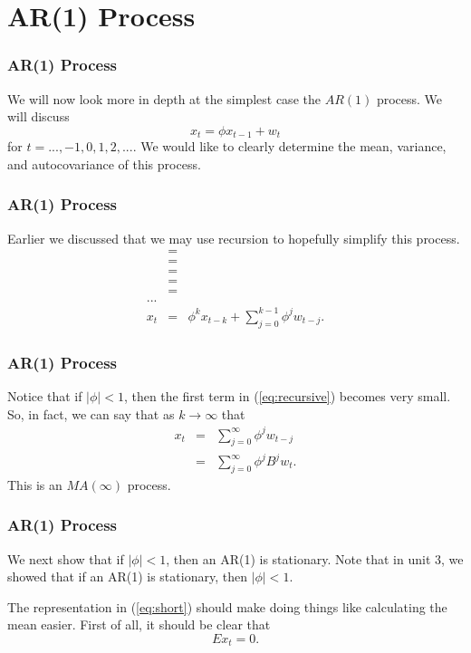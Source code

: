 \documentclass[%
xcolor=pdftex]{beamer}
\begin{document}
\section{AR(1) Process}
\frame{\tableofcontents[currentsection]}

\begin{frame}
\frametitle{AR(1) Process}

We will now look more in depth at the simplest case the $AR(1)$ process. We will discuss
$$
x_t= \phi x_{t-1}+w_t
$$
for $t=...,-1,0,1,2,...$.
We would like to clearly determine the mean, variance, and autocovariance of this process.

\end{frame}


\begin{frame}
\frametitle{AR(1) Process}

Earlier we discussed that we may use recursion to hopefully simplify this process.
\begin{eqnarray} \label{eq:recursive}
 & =&  \nonumber \\
 & =&  \nonumber \\
& =&  \nonumber \\
 &=&  \nonumber\\
&=&  \nonumber \\
...& & \nonumber \\
x_t & =&  \phi^k   x_{t-k}+\sum_{j=0}^{k-1} \phi^j w_{t-j}.
\end{eqnarray}

\end{frame}

\begin{frame}
\frametitle{AR(1) Process}

Notice that if $|\phi|<1$, then the first term in (\ref{eq:recursive}) becomes very small.  So, in fact, we can say that as $k \rightarrow \infty$ that
\begin{eqnarray} \label{eq:short}
x_t &=& \sum_{j=0}^{\infty} \phi^j w_{t-j} \nonumber \\
    &=& \sum_{j=0}^{\infty} \phi^j B^j w_t.
\end{eqnarray}
This is an $MA(\infty)$ process.

\end{frame}


\begin{frame}
\frametitle{AR(1) Process}

We next show that if $|\phi| < 1$, then an AR(1) is stationary. Note that in unit 3, we showed that if an AR(1) is stationary, then $|\phi| < 1$.\\

\vspace{5mm}

The representation in (\ref{eq:short}) should make doing things like calculating the mean easier. First of all, it should be clear that
 $$
 Ex_t =0.
 $$

\end{frame}
\end{document}
